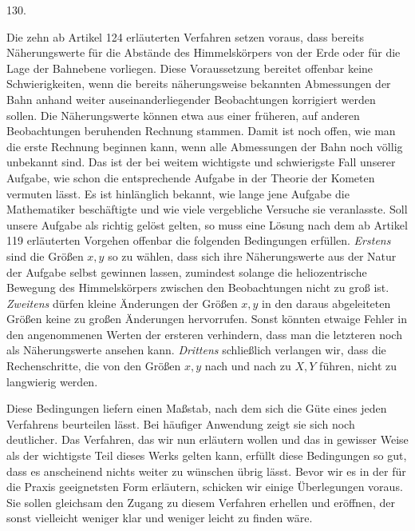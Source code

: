 \par{}\medskip
\begin{center}\hypertarget{native-177-article130}{}130.\end{center}
Die zehn ab Artikel 124 erläuterten Verfahren setzen voraus, dass bereits Näherungswerte für
die Abstände des Himmelskörpers von der Erde oder für die Lage der Bahnebene vorliegen. Diese
Voraussetzung bereitet offenbar keine Schwierigkeiten, wenn die bereits näherungsweise bekannten
Abmessungen der Bahn anhand weiter auseinanderliegender Beobachtungen korrigiert werden sollen. Die
Näherungswerte können etwa aus einer früheren, auf anderen Beobachtungen beruhenden Rechnung
stammen. Damit ist noch offen, wie man die erste Rechnung beginnen kann, wenn alle Abmessungen der
Bahn noch völlig unbekannt sind. Das ist der bei weitem wichtigste und schwierigste Fall unserer
Aufgabe, wie schon die entsprechende Aufgabe in der Theorie der Kometen vermuten lässt. Es ist
hinlänglich bekannt, wie lange jene Aufgabe die Mathematiker beschäftigte und wie viele vergebliche
Versuche sie veranlasste. Soll unsere Aufgabe als richtig gelöst gelten, so muss eine Lösung nach
dem ab Artikel 119 erläuterten Vorgehen offenbar die folgenden Bedingungen erfüllen. \emph{Erstens}
sind die Größen $x,y$ so zu wählen, dass sich ihre Näherungswerte aus der Natur der Aufgabe selbst
gewinnen lassen, zumindest solange die heliozentrische Bewegung des Himmelskörpers zwischen den
Beobachtungen nicht zu groß ist. \emph{Zweitens} dürfen kleine Änderungen der Größen $x,y$ in den
daraus abgeleiteten Größen keine zu großen Änderungen hervorrufen. Sonst könnten etwaige Fehler in
den angenommenen Werten der ersteren verhindern, dass man die letzteren noch als Näherungswerte
ansehen kann. \emph{Drittens} schließlich verlangen wir, dass die Rechenschritte, die von den Größen
$x,y$ nach und nach zu $X,Y$ führen, nicht zu langwierig werden.

Diese Bedingungen liefern einen Maßstab, nach dem sich die Güte eines jeden Verfahrens beurteilen
lässt. Bei häufiger Anwendung zeigt sie sich noch deutlicher. Das Verfahren, das wir nun erläutern
wollen und das in gewisser Weise als der wichtigste Teil dieses Werks gelten kann, erfüllt diese
Bedingungen so gut, dass es anscheinend nichts weiter zu wünschen übrig lässt. Bevor wir es in
der für die Praxis geeignetsten Form erläutern, schicken wir einige Überlegungen voraus. Sie sollen
gleichsam den Zugang zu diesem Verfahren erhellen und eröffnen, der sonst vielleicht weniger klar
und weniger leicht zu finden wäre.
